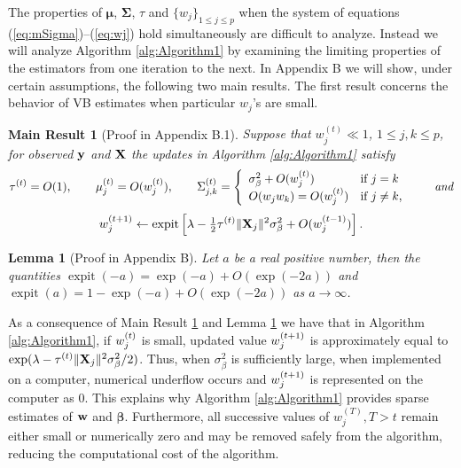 \documentclass[11pt]{article}
\newtheorem{Lemma}{Lemma}
\newtheorem{Main Result}{Main Result}
\def\vectorfontone{\bf}
\def\vectorfonttwo{\boldsymbol}
\def\vw{{\vectorfontone w}}                      %
\def\vy{{\vectorfontone y}}                      %
\def\vbeta{{\vectorfonttwo \beta}}               %
\def\vmu{{\vectorfonttwo \mu}}                   %
\def\matrixfontone{\bf}
\def\matrixfonttwo{\boldsymbol}
\def\mX{{\matrixfontone X}}                      %
\def\mSigma{{\matrixfonttwo \Sigma}}             %
\def\ds{\displaystyle}
\DeclareMathOperator{\expit}{expit}
\newcommand{\cyc}[1]{{\color{black}#1}}
\newcommand{\joc}[1]{{\color{black}#1}}
\begin{document}
\joc{The properties of $\vmu$, $\mSigma$, $\tau$ and $\{w_j\}_{1\le j\le p}$ when the system of equations (\ref{eq:mSigma})--(\ref{eq:wj}) hold simultaneously are difficult to analyze. 
Instead we will analyze Algorithm \ref{alg:Algorithm1} by examining the limiting properties
of the estimators from one iteration to the next.
%	
%
%
In Appendix B we will show, under certain assumptions,
the following two main results. The first result concerns the behavior of
VB estimates when particular $w_j$'s are small.}




\cyc{
	\begin{Main Result}[Proof in Appendix B.1]\label{mres:1}
		Suppose that $w_j^{(t)}\ll 1$, $1\le j,k\le p$, for observed $\vy$ and $\mX$ the updates in Algorithm \ref{alg:Algorithm1} satisfy
		$$
		\ds \tau^{(t)} = O(1), \qquad
		\ds \mu_j^{(t)} = O(w_j^{(t)}),
		\qquad
		\ds \Sigma_{j,k}^{(t)} = \left\{ \begin{array}{ll}
		\sigma_\beta^2 + O(w_j^{(t)}) & \mbox{if $j=k$} \\
		O(w_jw_k)=O(w_j^{(t)})               & \mbox{if $j\ne k$},
		\end{array} \right.
		\qquad \mbox{\it and}
		$$
		$$
		w_j^{(t+1)} \leftarrow \expit\left[ \lambda
		- \tfrac{1}{2}\tau^{(t)} \|\mX_j \|^2\sigma_\beta^2 + O(w_j^{(t-1)})
		\right].
		$$
	\end{Main Result}
}



\begin{Lemma}[Proof in Appendix B]\label{lem:1}
	Let $a$ be a real positive number,
	then the quantities $\expit(-a) = \exp(-a)+O(\exp(-2a))$ and $\expit(a)=1-\exp(-a)+O(\exp(-2a))$ as $a\rightarrow\infty$.
\end{Lemma}


As a consequence of Main Result \ref{mres:1} and Lemma \ref{lem:1} we have that
in Algorithm \ref{alg:Algorithm1}, if $w_j^{\cyc{(t)}}$ is small, updated value $w_j^{\cyc{(t+1)}}$ is
approximately equal to
$\exp(\lambda - \tau^{(t)} \|\mX_j \|^2\sigma_\beta^2/2)$. Thus,
when $\sigma_\beta^2$ is sufficiently large, when implemented
on a computer, numerical underflow occurs and $w_j^{\cyc{(t+1)}}$
is represented on the computer as 0. This explains why Algorithm \ref{alg:Algorithm1} provides sparse estimates of $\vw$ and $\vbeta$.
Furthermore, all successive values of \cyc{$w_j^{(T)}, T>t$} remain either small or
numerically zero and may be removed safely from the algorithm, reducing the
computational cost of the algorithm.
\end{document}
